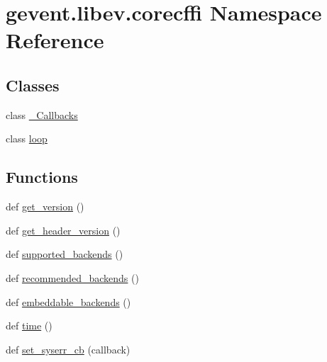 \hypertarget{namespacegevent_1_1libev_1_1corecffi}{}\section{gevent.\+libev.\+corecffi Namespace Reference}
\label{namespacegevent_1_1libev_1_1corecffi}
\subsection*{Classes}
\begin{DoxyCompactItemize}
\item 
class \hyperlink{classgevent_1_1libev_1_1corecffi_1_1___callbacks}{\+\_\+\+Callbacks}
\item 
class \hyperlink{classgevent_1_1libev_1_1corecffi_1_1loop}{loop}
\end{DoxyCompactItemize}
\subsection*{Functions}
\begin{DoxyCompactItemize}
\item 
def \hyperlink{namespacegevent_1_1libev_1_1corecffi_a0143ed79e5ee0fe2ac2f2eb467d41e71}{get\+\_\+version} ()
\item 
def \hyperlink{namespacegevent_1_1libev_1_1corecffi_adfa2f94e2af8eeb1f01432768697fcb2}{get\+\_\+header\+\_\+version} ()
\item 
def \hyperlink{namespacegevent_1_1libev_1_1corecffi_aea5431fadd47208295ee0efa9bd8a3c9}{supported\+\_\+backends} ()
\item 
def \hyperlink{namespacegevent_1_1libev_1_1corecffi_abc24701a1b7924da01153ec283668514}{recommended\+\_\+backends} ()
\item 
def \hyperlink{namespacegevent_1_1libev_1_1corecffi_a01a4e8376ed921292b38f40aecbb50db}{embeddable\+\_\+backends} ()
\item 
def \hyperlink{namespacegevent_1_1libev_1_1corecffi_a5e411498bbc225d852d1c6a911fe502d}{time} ()
\item 
def \hyperlink{namespacegevent_1_1libev_1_1corecffi_a9eeff9eb633beabce6c721fe16e6810f}{set\+\_\+syserr\+\_\+cb} (callback)
\end{DoxyCompactItemize}
